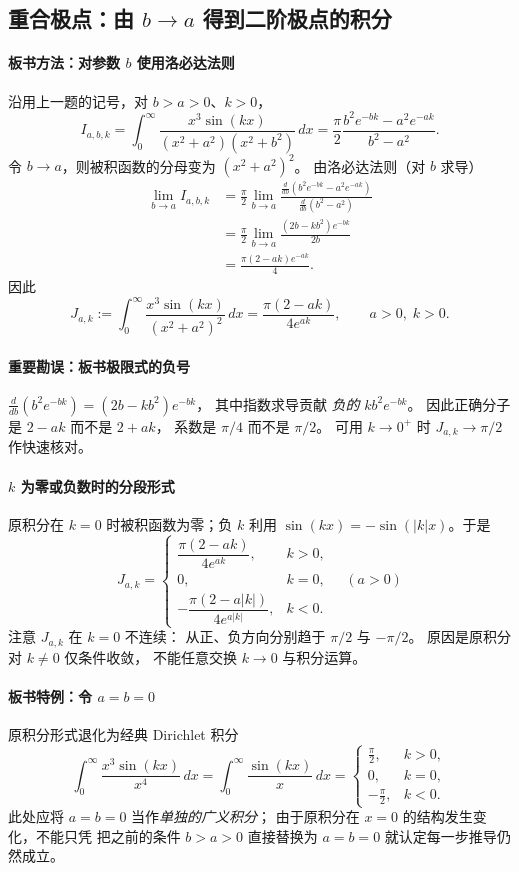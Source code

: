 \subsection*{重合极点：由 $b\to a$ 得到二阶极点的积分}

\paragraph{板书方法：对参数 $b$ 使用洛必达法则}
沿用上一题的记号，对 $b>a>0$、$k>0$，
\[
 I_{a,b,k}
 =\int_0^\infty
   \frac{x^3\sin(kx)}{(x^2+a^2)(x^2+b^2)}\,dx
 =\frac{\pi}{2}
  \frac{b^2e^{-bk}-a^2e^{-ak}}{b^2-a^2}.
\]
令 $b\to a$，则被积函数的分母变为 $(x^2+a^2)^2$。
由洛必达法则（对 $b$ 求导）
\begin{align*}
 \lim_{b\to a} I_{a,b,k}
 &=\frac{\pi}{2}\lim_{b\to a}
   \frac{\frac{d}{db}(b^2e^{-bk}-a^2e^{-ak})}
        {\frac{d}{db}(b^2-a^2)}\\
 &=\frac{\pi}{2}\lim_{b\to a}
   \frac{(2b-kb^2)e^{-bk}}{2b}\\
 &=\frac{\pi(2-ak)e^{-ak}}{4}.
\end{align*}
因此
\[
 \boxed{
 J_{a,k}:=\int_0^\infty
  \frac{x^3\sin(kx)}{(x^2+a^2)^2}\,dx
 =\frac{\pi(2-ak)}{4e^{ak}},
 \qquad a>0,\;k>0.}
\]

\paragraph{重要勘误：板书极限式的负号}
$\frac{d}{db}(b^2e^{-bk})=(2b-kb^2)e^{-bk}$，
其中指数求导贡献 \emph{负的} $kb^2e^{-bk}$。
因此正确分子是 $2-ak$ 而不是 $2+ak$，
系数是 $\pi/4$ 而不是 $\pi/2$。
可用 $k\to0^+$ 时 $J_{a,k}\to\pi/2$ 作快速核对。

\paragraph{$k$ 为零或负数时的分段形式}
原积分在 $k=0$ 时被积函数为零；负 $k$ 利用
$\sin(kx)=-\sin(|k|x)$。于是
\[
 \boxed{
 J_{a,k}=
 \begin{cases}
   \dfrac{\pi(2-ak)}{4e^{ak}}, & k>0,\\[5pt]
   0,&k=0,\\[4pt]
   -\dfrac{\pi(2-a|k|)}{4e^{a|k|}}, &k<0.
 \end{cases}\quad (a>0)}
\]
注意 $J_{a,k}$ 在 $k=0$ 不连续：
从正、负方向分别趋于 $\pi/2$ 与 $-\pi/2$。
原因是原积分对 $k\ne0$ 仅条件收敛，
不能任意交换 $k\to0$ 与积分运算。

\paragraph{板书特例：令 $a=b=0$}
原积分形式退化为经典 Dirichlet 积分
\[
 \int_0^\infty\frac{x^3\sin(kx)}{x^4}\,dx
 =\int_0^\infty\frac{\sin(kx)}{x}\,dx
 =\begin{cases}
   \frac{\pi}{2},&k>0,\\
   0,&k=0,\\
   -\frac{\pi}{2},&k<0.
  \end{cases}
\]
此处应将 $a=b=0$ 当作\emph{单独的广义积分}；
由于原积分在 $x=0$ 的结构发生变化，不能只凭
把之前的条件 $b>a>0$ 直接替换为 $a=b=0$
就认定每一步推导仍然成立。


